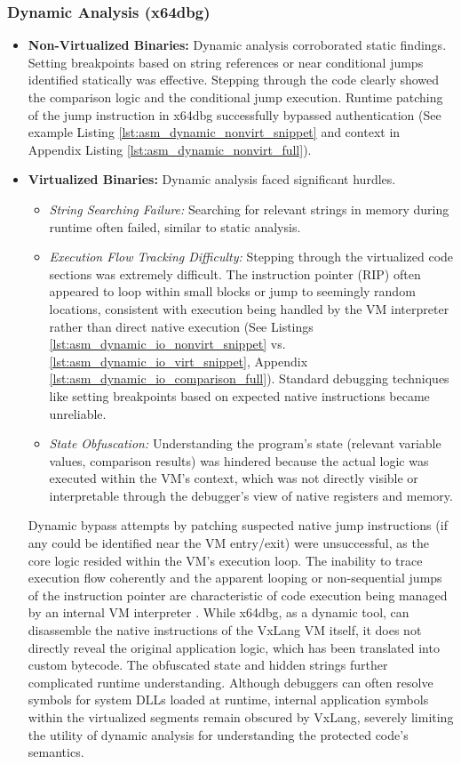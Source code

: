 \subsubsection{Dynamic Analysis (x64dbg)}
\begin{itemize}
	\item \textbf{Non-Virtualized Binaries:} Dynamic analysis corroborated static findings. Setting breakpoints based on string references or near conditional jumps identified statically was effective. Stepping through the code clearly showed the comparison logic and the conditional jump execution. Runtime patching of the jump instruction in x64dbg successfully bypassed authentication (See example Listing \ref{lst:asm_dynamic_nonvirt_snippet} and context in Appendix Listing \ref{lst:asm_dynamic_nonvirt_full}).
	\item \textbf{Virtualized Binaries:} Dynamic analysis faced significant hurdles.
	      \begin{itemize}
		      \item \textit{String Searching Failure:} Searching for relevant strings in memory during runtime often failed, similar to static analysis.
		      \item \textit{Execution Flow Tracking Difficulty:} Stepping through the virtualized code sections was extremely difficult. The instruction pointer (RIP) often appeared to loop within small blocks or jump to seemingly random locations, consistent with execution being handled by the VM interpreter rather than direct native execution (See Listings \ref{lst:asm_dynamic_io_nonvirt_snippet} vs. \ref{lst:asm_dynamic_io_virt_snippet}, Appendix \ref{lst:asm_dynamic_io_comparison_full}). Standard debugging techniques like setting breakpoints based on expected native instructions became unreliable.
		      \item \textit{State Obfuscation:} Understanding the program's state (relevant variable values, comparison results) was hindered because the actual logic was executed within the VM's context, which was not directly visible or interpretable through the debugger's view of native registers and memory.
	      \end{itemize}
	      Dynamic bypass attempts by patching suspected native jump instructions (if any could be identified near the VM entry/exit) were unsuccessful, as the core logic resided within the VM's execution loop. The inability to trace execution flow coherently and the apparent looping or non-sequential jumps of the instruction pointer are characteristic of code execution being managed by an internal VM interpreter \cite{Sikorski2012}. While x64dbg, as a dynamic tool, can disassemble the native instructions of the VxLang VM itself, it does not directly reveal the original application logic, which has been translated into custom bytecode. The obfuscated state and hidden strings further complicated runtime understanding. Although debuggers can often resolve symbols for system DLLs loaded at runtime, internal application symbols within the virtualized segments remain obscured by VxLang, severely limiting the utility of dynamic analysis for understanding the protected code's semantics.
\end{itemize}

